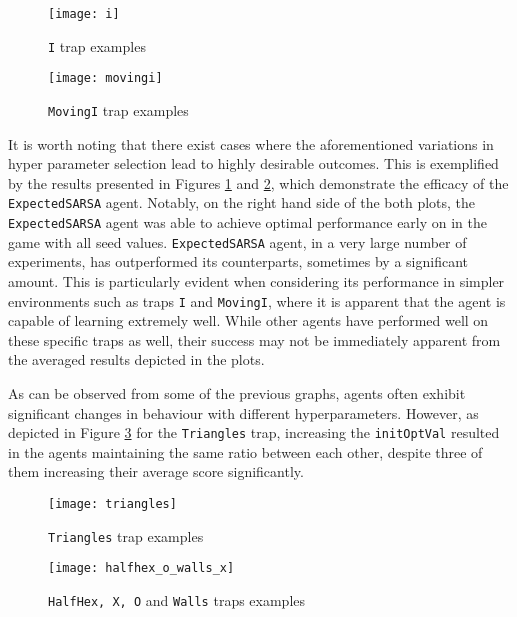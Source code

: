 \begin{figure}[h]
    \centering
    \texttt{[image: i]}
    \caption{\texttt{I} trap examples}
    \label{fig:i_eg}
\end{figure}

\begin{figure}[h]
    \centering
    \texttt{[image: movingi]}
    \caption{\texttt{MovingI} trap examples}
    \label{fig:movingi_eg}
\end{figure}


It is worth noting that there exist cases where the aforementioned variations in hyper parameter selection lead to highly desirable outcomes. This is exemplified by the results presented in Figures \ref{fig:i_eg} and \ref{fig:movingi_eg}, which demonstrate the efficacy of the \texttt{ExpectedSARSA} agent. Notably, on the right hand side of the both plots, the \texttt{ExpectedSARSA} agent was able to achieve optimal performance early on in the game with all seed values. \texttt{ExpectedSARSA} agent, in a very large number of experiments, has outperformed its counterparts, sometimes by a significant amount. This is particularly evident when considering its performance in simpler environments such as traps \texttt{I} and \texttt{MovingI}, where it is apparent that the agent is capable of learning extremely well. While other agents have performed well on these specific traps as well, their success may not be immediately apparent from the averaged results depicted in the plots.

As can be observed from some of the previous graphs, agents often exhibit significant changes in behaviour with different hyperparameters. However, as depicted in Figure \ref{fig:triangles_eg} for the \texttt{Triangles} trap, increasing the \texttt{initOptVal} resulted in the agents maintaining the same ratio between each other, despite three of them increasing their average score significantly.

\begin{figure}[h]
    \centering
    \texttt{[image: triangles]}
    \caption{\texttt{Triangles} trap examples}
    \label{fig:triangles_eg}
\end{figure}

\begin{figure}[h]
    \centering
    \texttt{[image: halfhex\_o\_walls\_x]}
    \caption{\texttt{HalfHex, X, O} and \texttt{Walls} traps examples}
    \label{fig:halfhex_o_walls_x_eg}
\end{figure}

